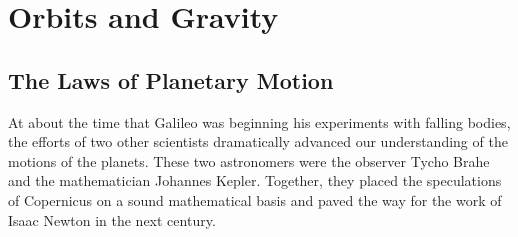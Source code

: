 \documentclass[../../main-astronomy.tex]{subfiles}
\begin{document}
\section{Orbits and Gravity}

\subsection{The Laws of Planetary Motion}

At about the time that Galileo was beginning his experiments with falling bodies, the efforts of two other scientists dramatically advanced our understanding of the motions of the planets. These two astronomers were the observer Tycho Brahe and the mathematician Johannes Kepler. Together, they placed the speculations of Copernicus on a sound mathematical basis and paved the way for the work of Isaac Newton in the next century.
\end{document}
